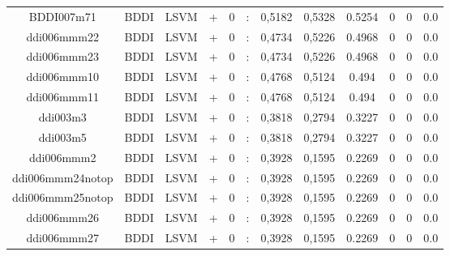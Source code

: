 \documentclass[a4paper]{article}
\begin{document}
\begin{landscape}
\begin{center}
\begin{tabular}{ |c|c|c|c|c|c|c|c|c|c|c|c|}
 
 	
 	\small{ BDDI007m71 } & BDDI & LSVM & +  &  0 &  :  &  0,5182 & 0,5328 & 0.5254  &  0 & 0 & 0.0 \\
 	

 
 	
 	\small{ ddi006mmm22 } & BDDI & LSVM & +  &  0 &  :  &  0,4734 & 0,5226 & 0.4968  &  0 & 0 & 0.0 \\
 	

 
 	
 	\small{ ddi006mmm23 } & BDDI & LSVM & +  &  0 &  :  &  0,4734 & 0,5226 & 0.4968  &  0 & 0 & 0.0 \\
 	

 
 	
 	\small{ ddi006mmm10 } & BDDI & LSVM & +  &  0 &  :  &  0,4768 & 0,5124 & 0.494  &  0 & 0 & 0.0 \\
 	

 
 	
 	\small{ ddi006mmm11 } & BDDI & LSVM & +  &  0 &  :  &  0,4768 & 0,5124 & 0.494  &  0 & 0 & 0.0 \\
 	

 
 	
 	\small{ ddi003m3 } & BDDI & LSVM & +  &  0 &  :  &  0,3818 & 0,2794 & 0.3227  &  0 & 0 & 0.0 \\
 	

 
 	
 	\small{ ddi003m5 } & BDDI & LSVM & +  &  0 &  :  &  0,3818 & 0,2794 & 0.3227  &  0 & 0 & 0.0 \\
 	

 
 	
 	\small{ ddi006mmm2 } & BDDI & LSVM & +  &  0 &  :  &  0,3928 & 0,1595 & 0.2269  &  0 & 0 & 0.0 \\
 	

 
 	
 	\small{ ddi006mmm24notop } & BDDI & LSVM & +  &  0 &  :  &  0,3928 & 0,1595 & 0.2269  &  0 & 0 & 0.0 \\
 	

 
 	
 	\small{ ddi006mmm25notop } & BDDI & LSVM & +  &  0 &  :  &  0,3928 & 0,1595 & 0.2269  &  0 & 0 & 0.0 \\
 	

 
 	
 	\small{ ddi006mmm26 } & BDDI & LSVM & +  &  0 &  :  &  0,3928 & 0,1595 & 0.2269  &  0 & 0 & 0.0 \\
 	

 
 	
 	\small{ ddi006mmm27 } & BDDI & LSVM & +  &  0 &  :  &  0,3928 & 0,1595 & 0.2269  &  0 & 0 & 0.0 \\
 	


\end{tabular}
\end{center}
\end{landscape}
\end{document}
